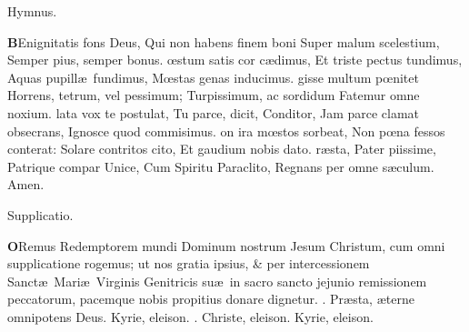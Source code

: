 \documentclass[letter,11pt]{book}
\makeatletter
\DeclareRobustCommand{\Rbar}{\vers@resp{0pt}{R}}
\newcommand{\vers@resp@sym}{\raisebox{0.2ex}{\rotatebox[origin=c]{-20}{$\m@th\rceil$}}}
\newcommand{\vers@resp}[2]{%
  {\ooalign{\hidewidth\kern#1\vers@resp@sym\hidewidth\cr#2\cr}}%
}%
\def\R{\color{Red} \Rbar . \color{black}}
\makeatother
\begin{document}
\begin{multicols*}{2}
\vspace{-.5em} \begin{center} \color{Red} Hymnus. \color{black} \end{center} \vspace{-.5em}
\lettrine[lines=2]{\bfseries \color{Red} B}{}Enignitatis fons Deus,
\newline Qui non habens finem boni
\newline \indent Super malum scelestium,
\newline \indent Semper pius, semper bonus.
\oe stum satis cor c\ae dimus,
\newline \indent Et triste pectus tundimus,
\newline \indent Aquas pupill\ae \ fundimus,
\newline \indent M\oe stas genas inducimus.
gisse multum p\oe nitet
\newline \indent Horrens, tetrum, vel pessimum;
\newline \indent Turpissimum, ac sordidum
\newline \indent Fatemur omne noxium.
lata vox te postulat,
\newline \indent Tu parce, dicit, Conditor,
\newline \indent Jam parce clamat obsecrans,
\newline \indent Ignosce quod commisimus.
on ira m\oe stos sorbeat,
\newline \indent Non p\oe na fessos conterat:
\newline \indent Solare contritos cito,
\newline \indent Et gaudium nobis dato.
r\ae sta, Pater piissime,
\newline \indent Patrique compar Unice,
\newline \indent Cum Spiritu Paraclito,
\newline \indent Regnans per omne s\ae culum. Amen.
\vspace{-.5em} \begin{center} \color{Red} Supplicatio. \color{black} \end{center} \vspace{-.5em}
\lettrine[lines=2]{\bfseries \color{Red} O}{}Remus Redemptorem mundi Dominum nostrum Jesum Christum, cum omni supplicatione rogemus; ut nos gratia ipsius, \& per intercessionem Sanct\ae \ Mari\ae \ Virginis Genitricis su\ae \ in sacro sancto jejunio remissionem peccatorum, pacemque nobis propitius donare dignetur. \R Pr\ae sta, \ae terne omnipotens Deus. Kyrie, eleison. \R Christe, eleison. Kyrie, eleison.

\end{multicols*}
\end{document}
